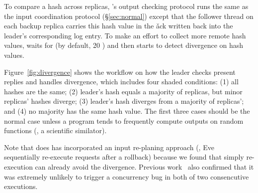 To compare a hash across replicas, \xxx's output checking protocol runs the 
same as the input coordination protocol (\S\ref{sec:normal}) except that the 
follower thread on each backup replica carries this hash value in the \v{ack} 
written back into the leader's corresponding log entry. To make an effort to 
collect more remote hash values, \xxx waits for \twait (by default, 20 \us) 
and then starts to detect divergence on hash values.


Figure~\ref{fig:divergence} shows the workflow on how the leader checks 
present replies and handles divergence, which includes four shaded conditions: 
(1) all hashes are the same; (2) leader's hash equals a majority of replicas, 
but minor replicas' hashes diverge; (3) leader's hash diverges from a majority 
of replicas'; and (4) no majority has the same hash value. The first three 
cases should be the normal case unless a program tends to frequently compute 
outputs on random functions (\eg, a scientific similator).

Note that \xxx does has incorporated an input re-planing approach (\eg, 
Eve~\cite{eve:osdi12} sequentially re-execute requests after a rollback) because 
we found that simply re-execution can already avoid the divergence. Previous 
work~\cite{lu:concurrency-bugs,pres:sosp09} also confirmed that it was 
extremely unlikely to trigger a concurrency bug in both of two consencutive 
executions.


